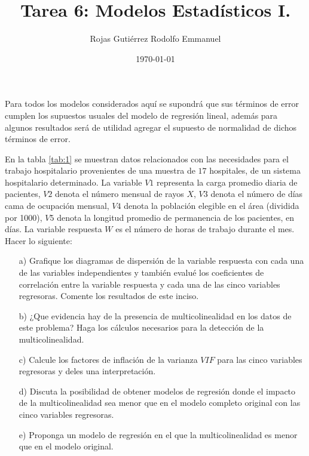 \documentclass[10.5pt,notitlepage]{article}
\title{Tarea 6: Modelos Estadísticos I.}
\author{Rojas Gutiérrez Rodolfo Emmanuel}
\date{\today}
\renewcommand{\qedsymbol}{$\blacksquare$}
\theoremstyle{plain}
\newenvironment{rem}
  {\pushQED{\qed}\renewcommand{\qedsymbol}{$\triangle$}\remarkex}
  {\popQED\endremarkex}
\begin{document}
\maketitle

\begin{rem}
Para todos los modelos considerados aquí se supondrá que sus términos de error cumplen los supuestos usuales del modelo de regresión lineal, además para algunos resultados será de utilidad agregar el supuesto de normalidad de dichos términos de error.
\end{rem}
\setcounter{exo}{0}
\begin{exo} En la tabla \ref{tab:1} se muestran datos relacionados con las necesidades para el trabajo hospitalario provenientes de una muestra de \(17\) hospitales, de un sistema hospitalario determinado. La variable \(V1\) representa la carga promedio diaria de pacientes, \(V2\) denota el número mensual de rayos \(X\), \(V3\) denota el número de días cama de ocupación mensual, \(V4\) denota la población elegible en el área (dividida por 1000), \(V5\) denota la longitud promedio de permanencia de los pacientes, en días. La variable respuesta \(W\) es el número de horas de trabajo durante el mes. Hacer lo siguiente: 
\begin{itemize}
    \item[a)] Grafique los diagramas de dispersión de la variable respuesta con cada una de las variables independientes y también evalué los coeficientes de correlación entre la variable respuesta y cada una de las cinco variables regresoras. Comente los resultados de este inciso.
    \item[b)] ¿Que evidencia hay de la presencia de multicolinealidad en los datos de este problema? Haga los cálculos necesarios para la detección de la multicolinealidad.
    \item[c)] Calcule los factores de inflación de la varianza \(VIF\) para las cinco variables regresoras y deles una interpretación.
    \item[d)] Discuta la posibilidad de obtener modelos de regresión donde el impacto
de la multicolinealidad sea menor que en el modelo completo original con
las cinco variables regresoras.
    \item[e)] Proponga un modelo de regresión en el que la multicolinealidad es menor que en el modelo original.
\end{itemize}
\end{exo}
\end{document}
